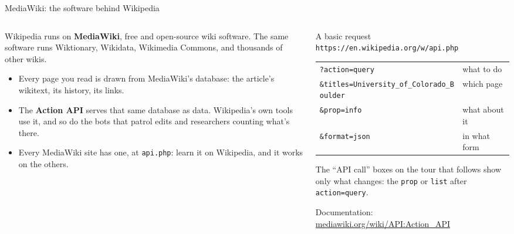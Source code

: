 \documentclass[9pt,aspectratio=169]{beamer}
\begin{document}
\begin{frame}{MediaWiki: the software behind Wikipedia}
    \begin{columns}[T]
        \begin{column}{0.44\textwidth}
            Wikipedia runs on \textbf{MediaWiki}, free and open-source wiki software. The same software runs Wiktionary, Wikidata, Wikimedia Commons, and thousands of other wikis.
            \begin{itemize}\small
                \item Every page you read is drawn from MediaWiki's database: the article's wikitext, its history, its links.
                \item The \textbf{Action API} serves that same database as data. Wikipedia's own tools use it, and so do the bots that patrol edits and researchers counting what's there.
                \item Every MediaWiki site has one, at \texttt{api.php}: learn it on Wikipedia, and it works on the others.
            \end{itemize}
        \end{column}
        \begin{column}{0.54\textwidth}
            \begin{block}{A basic request}
                \footnotesize
                \texttt{https://en.wikipedia.org/w/api.php}\\[0.3em]
                \begin{tabular}{@{}ll@{}}
                    \texttt{?action=query} & what to do \\
                    \texttt{\&titles=University\_of\_Colorado\_Boulder} & which page \\
                    \texttt{\&prop=info} & what about it \\
                    \texttt{\&format=json} & in what form
                \end{tabular}
            \end{block}
            \small The ``API call'' boxes on the tour that follows show only what changes: the \texttt{prop} or \texttt{list} after \texttt{action=query}.

            \bigskip
            
            Documentation: \href{https://www.mediawiki.org/wiki/API:Action_API}{mediawiki.org/wiki/API:Action\_API}
        \end{column}
    \end{columns}
\end{frame}
\end{document}

